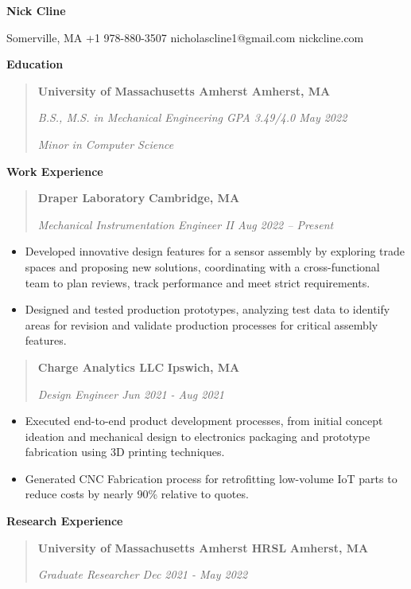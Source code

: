 \documentclass[
]{article}
\author{}
\date{}
\begin{document}
\textbf{Nick Cline}

Somerville, MA \textbar{} +1 978-880-3507 \textbar{}
nicholascline1@gmail.com \textbar{} nickcline.com

\textbf{Education}

\begin{quote}
\textbf{University of Massachusetts Amherst Amherst, MA}

\emph{B.S., M.S. in Mechanical Engineering \textbar{} GPA 3.49/4.0 May
2022}

\emph{Minor in Computer Science}
\end{quote}

\textbf{Work Experience}

\begin{quote}
\textbf{Draper Laboratory} \textbf{Cambridge, MA}

\emph{Mechanical Instrumentation Engineer II Aug 2022 -- Present}
\end{quote}

\begin{itemize}
\item
  Developed innovative design features for a sensor assembly by
  exploring trade spaces and proposing new solutions, coordinating with
  a cross-functional team to plan reviews, track performance and meet
  strict requirements.
\item
  Designed and tested production prototypes, analyzing test data to
  identify areas for revision and validate production processes for
  critical assembly features.
\end{itemize}

\begin{quote}
\textbf{Charge Analytics LLC} \textbf{Ipswich, MA}

\emph{Design Engineer Jun 2021 - Aug 2021}
\end{quote}

\begin{itemize}
\item
  Executed end-to-end product development processes, from initial
  concept ideation and mechanical design to electronics packaging and
  prototype fabrication using 3D printing techniques.
\item
  Generated CNC Fabrication process for retrofitting low-volume IoT
  parts to reduce costs by nearly 90\% relative to quotes.
\end{itemize}

\textbf{Research Experience}

\begin{quote}
\textbf{University of Massachusetts Amherst HRSL} \textbf{Amherst, MA}

\emph{Graduate Researcher Dec 2021 - May 2022}
\end{quote}
\end{document}
